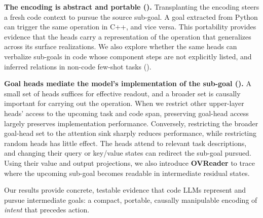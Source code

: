 \textbf{The encoding is abstract and portable ().} Transplanting the encoding steers a fresh code context to pursue the source sub-goal. A goal extracted from Python can trigger the same operation in C++, and vice versa. This portability provides evidence that the heads carry a representation of the operation that generalizes across its surface realizations. We also explore whether the same heads can verbalize sub-goals in code whose component steps are not explicitly listed, and inferred relations in non-code few-shot tasks ().

\textbf{Goal heads mediate the model's implementation of the sub-goal ().} A small set of heads suffices for effective readout, and a broader set is causally important for carrying out the operation. When we restrict other upper-layer heads' access to the upcoming task and code span, preserving goal-head access largely preserves implementation performance. Conversely, restricting the broader goal-head set to the attention sink sharply reduces performance, while restricting random heads has little effect. The heads attend to relevant task descriptions, and changing their query or key/value states can redirect the sub-goal pursued. Using their value and output projections, we also introduce \textbf{OVReader} to trace where the upcoming sub-goal becomes readable in intermediate residual states.

Our results provide concrete, testable evidence that code LLMs represent and pursue intermediate goals: a compact, portable, causally manipulable encoding of \emph{intent} that precedes action.
